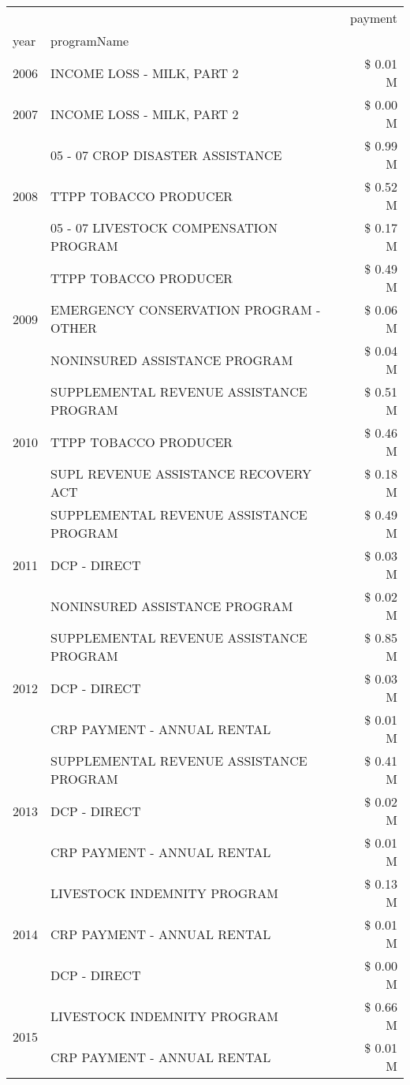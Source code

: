 \begin{tabular}{llr}
\toprule
 &  & payment \\
year & programName &  \\
\midrule
2006 & INCOME LOSS - MILK, PART 2 & \$ 0.01 M \\
\cline{1-3}
2007 & INCOME LOSS - MILK, PART 2 & \$ 0.00 M \\
\cline{1-3}
\multirow[t]{3}{*}{2008} & 05 - 07 CROP DISASTER ASSISTANCE & \$ 0.99 M \\
 & TTPP TOBACCO PRODUCER & \$ 0.52 M \\
 & 05 - 07 LIVESTOCK COMPENSATION PROGRAM & \$ 0.17 M \\
\cline{1-3}
\multirow[t]{3}{*}{2009} & TTPP TOBACCO PRODUCER & \$ 0.49 M \\
 & EMERGENCY CONSERVATION PROGRAM - OTHER & \$ 0.06 M \\
 & NONINSURED ASSISTANCE PROGRAM & \$ 0.04 M \\
\cline{1-3}
\multirow[t]{3}{*}{2010} & SUPPLEMENTAL REVENUE ASSISTANCE PROGRAM & \$ 0.51 M \\
 & TTPP TOBACCO PRODUCER & \$ 0.46 M \\
 & SUPL REVENUE ASSISTANCE RECOVERY ACT & \$ 0.18 M \\
\cline{1-3}
\multirow[t]{3}{*}{2011} & SUPPLEMENTAL REVENUE ASSISTANCE PROGRAM & \$ 0.49 M \\
 & DCP - DIRECT & \$ 0.03 M \\
 & NONINSURED ASSISTANCE PROGRAM & \$ 0.02 M \\
\cline{1-3}
\multirow[t]{3}{*}{2012} & SUPPLEMENTAL REVENUE ASSISTANCE PROGRAM & \$ 0.85 M \\
 & DCP - DIRECT & \$ 0.03 M \\
 & CRP PAYMENT - ANNUAL RENTAL & \$ 0.01 M \\
\cline{1-3}
\multirow[t]{3}{*}{2013} & SUPPLEMENTAL REVENUE ASSISTANCE PROGRAM & \$ 0.41 M \\
 & DCP - DIRECT & \$ 0.02 M \\
 & CRP PAYMENT - ANNUAL RENTAL & \$ 0.01 M \\
\cline{1-3}
\multirow[t]{3}{*}{2014} & LIVESTOCK INDEMNITY PROGRAM & \$ 0.13 M \\
 & CRP PAYMENT - ANNUAL RENTAL & \$ 0.01 M \\
 & DCP - DIRECT & \$ 0.00 M \\
\cline{1-3}
\multirow[t]{3}{*}{2015} & LIVESTOCK INDEMNITY PROGRAM & \$ 0.66 M \\
 & CRP PAYMENT - ANNUAL RENTAL & \$ 0.01 M \\

\end{tabular}
